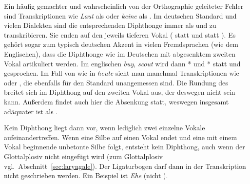 Ein häufig gemachter und wahrscheinlich von der Orthographie geleiteter Fehler sind Transkriptionen wie \textit{Laut} als \Ast\textipa{[l\t{aU}t]} oder \textit{keine} als \Ast\textipa{[k\t{aI}ne]}.
Im deutschen Standard und vielen Dialekten sind die entsprechenden Diphthonge immer als \textipa{[\t{aE}]} und \textipa{[\t{aO}]} zu transkribieren.
Sie enden auf den jeweils tieferen Vokal (\textipa{[O]} statt \textipa{[U]} und \textipa{[E]} statt \textipa{[I]}).
Es gehört sogar zum typisch deutschen Akzent in vielen Fremdsprachen (wie \zB dem Englischen), dass die Diphthonge wie im Deutschen mit abgesenktem zweiten Vokal artikuliert werden.
Im englischen \textit{buy}, \textit{scout} wird dann *\textipa{[b\t{aE}]} und *\textipa{[sk\t{aO}t]} statt \textipa{[b\t{aI}]} und \textipa{[sk\t{aU}t]} gesprochen.
Im Fall von \textipa{[\t{O\oe}]} wie in \textit{heute} \textipa{[h\t{O\oe}t@]} sieht man manchmal Transkriptionen wie \textipa{[\t{OI}]} oder \textipa{[\t{OY}]}, die ebenfalls für den Standard unangemessen sind.
Die Rundung des \textipa{[O]} breitet sich im Diphthong auf den zweiten Vokal aus, der deswegen nicht \textipa{[I]} sein kann.
Außerdem findet auch hier die Absenkung statt, weswegen insgesamt \textipa{[\t{O\oe}]} adäquater ist als \textipa{[\t{OY}]}.

Kein Diphthong liegt dann vor, wenn lediglich zwei einzelne Vokale aufeinandertreffen.
Wenn eine Silbe auf einen Vokal endet und eine mit einem Vokal beginnende unbetonte Silbe folgt, entsteht kein Diphthong, auch wenn der Glottalplosiv nicht eingefügt wird (zum Glottalplosiv vgl.\ Abschnitt~\ref{sec:laryngale}).
Der Ligaturbogen darf dann in der Transkription nicht geschrieben werden.
Ein Beispiel ist \textit{Ehe} \textipa{[Pe:@]} (nicht \Ast\textipa{[P\t{e@}]}).

